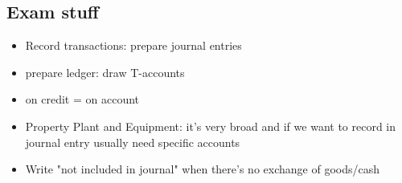 \documentclass{article}
\begin{document}
\begin{multicols}{2}
\section{Exam stuff}
\begin{itemize}
	\item Record transactions: prepare journal entries
	\item prepare ledger: draw T-accounts
	\item on credit = on account
	\item Property Plant and Equipment: it's very broad and if we want to record in journal entry usually need specific accounts
	\item Write "not included in journal" when there's no exchange of goods/cash
\end{itemize}
\end{multicols}
\end{document}
